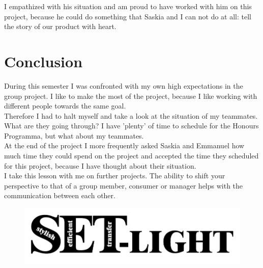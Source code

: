 \documentclass[11pt]{article}
\begin{document}
I empathized with his situation and am proud to have worked with him on this project, because he could do something that Saskia and I can not do at all: tell the story of our product with heart.\\

\section{Conclusion}

During this semester I was confronted with my own high expectations in the group project. I like to make the most of the project, because I like working with different people towards the same goal. \\

Therefore I had to halt myself and take a look at the situation of my teammates. What are they going through? I have 'plenty' of time to schedule for the Honours Programma, but what about my teammates.\\

At the end of the project I more frequently asked Saskia and Emmanuel how much time they could spend on the project and accepted the time they scheduled for this project, because I have thought about their situation. \\

I take this lesson with me on further projects. The ability to shift your perspective to that of a group member, consumer or manager helps with the communication between each other.

\begin{figure}[H]
	\centering
	\includegraphics[width=\textwidth]{naamloos.png}
\end{figure}






	
\end{document}
